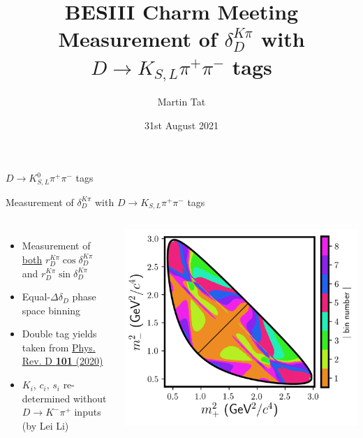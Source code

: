 \documentclass{beamer}
\title[University of Oxford]{BESIII Charm Meeting \\Measurement of $\delta_D^{K\pi}$ with $D\to K_{S, L}\pi^+\pi^-$ tags}
\author{Martin Tat}
\institute{University of Oxford}
\date{31st August 2021}
\begin{document}
\begin{frame}
  \titlepage
\end{frame}


\begin{frame}{$D\to K_{S, L}^0\pi^+\pi^-$ tags}
  \begin{center}
    {\huge Measurement of $\delta_D^{K\pi}$ with $D\to K_{S, L}\pi^+\pi^-$ tags}
  \end{center}
  \begin{columns}
    \begin{itemize}
      \setlength\itemsep{1.0em}
      \item{Measurement of \underline{both} $r_D^{K\pi}\cos\delta_D^{K\pi}$ and $r_D^{K\pi}\sin\delta_D^{K\pi}$}
      \item{Equal-$\Delta\delta_D$ phase space binning}
      \item{Double tag yields taken from \href{https://doi.org/10.1103/PhysRevD.101.112002}{Phys. Rev. D \textbf{101} (2020)}}
      \item{$K_i$, $c_i$, $s_i$ re-determined without $D\to K^-\pi^+$ inputs (by Lei Li)}
    \end{itemize}
    \centering
    \includegraphics[width=\textwidth]{KsPiPi_equal.png}
  \end{columns}
\end{frame}
\end{document}
